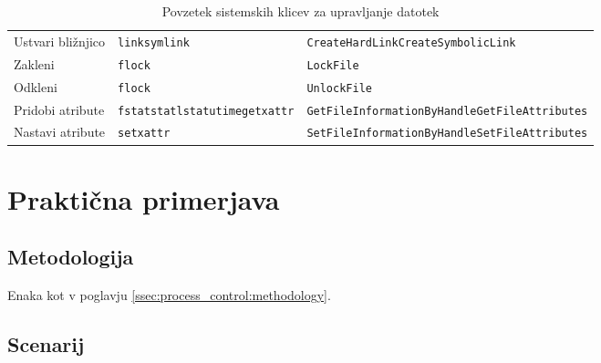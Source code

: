 \documentclass[a4paper,12pt,openright]{book}
\begin{document}
\begin{table}[h!]
\begin{center}
\begin{tabular}{ p{3.7cm}|p{2.5cm}|p{6cm} }
			Ustvari bližnjico & \verb|link|\newline\verb|symlink|                                                              & \verb|CreateHardLink|\newline\verb|CreateSymbolicLink|            \\
			Zakleni            & \verb|flock|                                                                                   & \verb|LockFile|                                                   \\
			Odkleni            & \verb|flock|                                                                                   & \verb|UnlockFile|                                                 \\
			Pridobi atribute   & \verb|fstat|\newline\verb|stat|\newline\verb|lstat|\newline\verb|utime|\newline\verb|getxattr| & \verb|GetFileInformationByHandle|\newline\verb|GetFileAttributes| \\
			Nastavi atribute   & \verb|setxattr|                                                                                & \verb|SetFileInformationByHandle|\newline\verb|SetFileAttributes| \\
		\end{tabular}
	\end{center}
	\label{tab:file_management}
	\caption{Povzetek sistemskih klicev za upravljanje datotek}
\end{table}

\section{Praktična primerjava}

\subsection{Metodologija}

Enaka kot v poglavju \ref{ssec:process_control:methodology}.

\subsection{Scenarij}
\end{document}
